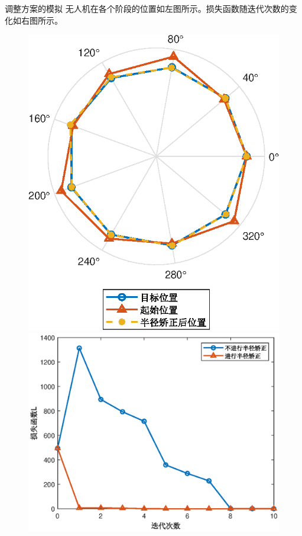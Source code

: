 \documentclass[aspectratio=169]{beamer}
\begin{document}
\begin{frame}{调整方案的模拟}
    无人机在各个阶段的位置如左图所示。损失函数随迭代次数的变化如右图所示。
    \begin{figure}[!ht]
        \centering
        \begin{minipage}[t]{0.32\textwidth}
            \centering
            \includegraphics[width=\textwidth]{图片/无人机位置对比.eps}
        \end{minipage}
        \begin{minipage}[t]{0.55\textwidth}
            \centering
            \includegraphics[width=\textwidth]{图片/损失函数变化.eps}
        \end{minipage}
    \end{figure}
\end{frame}
\end{document}
